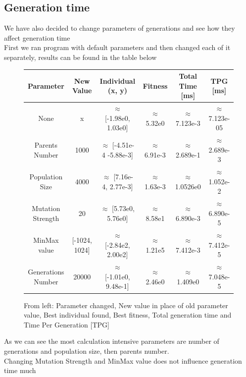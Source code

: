 \documentclass{article}[12pt]
\begin{document}
\subsection{Generation time}
We have also decided to change parameters of generations and see how they affect generation time \\ 
First we ran program with default parameters and then changed each of it separately, results can be found in the table below \\ 
\begin{figure}[H]
    \caption{From left: Parameter changed, New value in place of old parameter value, Best individual found, Best fitness, Total generation time and Time Per Generation [TPG]}
\begin{tabular}{| c | c | c | c | c | c |}
    \hline
Parameter & New Value & Individual (x, y) & Fitness & Total Time [ms] & TPG [ms]   \\
\hline
None & x & $\approx$ [-1.98e0,  1.03e0] & $\approx$ 5.32e0 & $\approx$ 7.123e-3 & $\approx$ 7.123e-05  \\
\hline
Parents Number & 1000 & $\approx$ [-4.51e-4  -5.88e-3] & $\approx$  6.91e-3 & $\approx$ 2.689e-1 & $\approx$ 2.689e-3  \\
\hline
Population Size & 4000 & $\approx$ [7.16e-4,  2.77e-3] & $\approx$ 1.63e-3 & $\approx$ 1.0526e0 & $\approx$ 1.052e-2  \\
\hline
Mutation Strength & 20 & $\approx$ [5.73e0,   5.76e0] & $\approx$  8.58e1 & $\approx$ 6.890e-3 &  $\approx$ 6.890e-5  \\
\hline
MinMax value & [-1024, 1024] & $\approx$ [-2.84e2,  2.00e2] & $\approx$ 1.21e5 & $\approx$ 7.412e-3 & $\approx$ 7.412e-5  \\
\hline
Generations Number & 20000 & $\approx$ [-1.01e0,  9.48e-1] & $\approx$ 2.46e0 & $\approx$ 1.409e0 & $\approx$ 7.048e-5  \\
\hline
    
\end{tabular}
\end{figure}
As we can see the most calculation intensive parameters are number of generations and population size, then parents number. \\ Changing Mutation Strength and MinMax value does not influence generation time much
\end{document}
